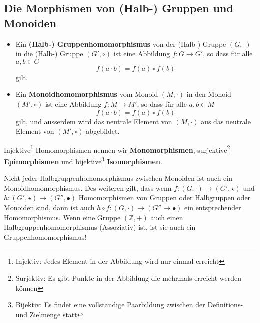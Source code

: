 \subsection{Die Morphismen von (Halb-) Gruppen und Monoiden}
\begin{itemize}
	\item Ein \textbf{(Halb-) Gruppenhomomorphismus} von der (Halb-) Gruppe $(G, \cdot)$ in die (Halb-) Gruppe $(G', \circ)$ ist eine Abbildung $f: G \rightarrow G'$, so dass für alle $a,b \in G$ 
	$$f(a \cdot b) = f(a) \circ f(b)$$
	gilt.
	\item Ein \textbf{Monoidhomomorphismus} vom Monoid $(M, \cdot)$ in den Monoid $(M', \circ)$ ist eine Abbildung $f: M \rightarrow M'$, so dass für alle $a,b \in M$
	$$ f(a\cdot b) = f(a) \circ f(b)$$
	gilt, und ausserdem wird das neutrale Element von $(M, \cdot)$ aus das neutrale Element von $(M', \circ)$ abgebildet.
\end{itemize}
Injektive\footnote{Injektiv: Jedes Element in der Abbildung wird nur einmal erreicht} Homomorphismen nennen wir \textbf{Monomorphismen}, surjektive\footnote{Surjektiv: Es gibt Punkte in der Abbildung die mehrmals erreicht werden können} \textbf{Epimorphismen} und bijektive\footnote{Bijektiv: Es findet eine vollständige Paarbildung zwischen der Definitions- und Zielmenge statt} \textbf{Isomorphismen}.
\begin{bem}
Nicht jeder Halbgruppenhomomorphismus zwischen Monoiden ist auch ein Monoidhomomorphismus. Des weiteren gilt, dass wenn $f: (G, \cdot) \rightarrow (G', \star) $ und $h: (G', \star) \rightarrow (G'', \bullet) $ Homomorphismen von Gruppen oder Halbgruppen oder Monoiden sind, dann ist auch $h \circ f : (G, \cdot) \rightarrow (G'' \rightarrow \bullet)$ ein entsprechender Homomorphismus.
\newline
Wenn eine Gruppe $(\mathbb{Z}, +)$ auch einen Halbgruppenhomomorphismus (Assoziativ) ist, ist sie auch ein Gruppenhomomorphismus!
\end{bem}

